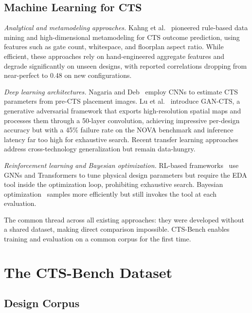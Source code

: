 \documentclass[acmsmall,review,anonymous]{acmart}
\begin{document}
\subsection{Machine Learning for CTS}

\textit{Analytical and metamodeling approaches.}
Kahng et al.~\cite{kahng,kahng2,kahng3} pioneered rule-based data mining and
high-dimensional metamodeling for CTS outcome prediction, using features such
as gate count, whitespace, and floorplan aspect ratio. While efficient, these
approaches rely on hand-engineered aggregate features and degrade significantly
on unseen designs, with reported correlations dropping from near-perfect to
0.48 on new configurations.

\textit{Deep learning architectures.}
Nagaria and Deb~\cite{nagaria2020} employ CNNs to estimate CTS parameters
from pre-CTS placement images. Lu et al.~\cite{gan-cts} introduce GAN-CTS, a
generative adversarial framework that exports high-resolution spatial maps and
processes them through a 50-layer convolution, achieving impressive per-design
accuracy but with a 45\% failure rate on the NOVA benchmark and inference
latency far too high for exhaustive search. Recent transfer learning
approaches~\cite{zhang2024,zhao2025} address cross-technology generalization
but remain data-hungry.

\textit{Reinforcement learning and Bayesian optimization.}
RL-based frameworks~\cite{agnesina,thomas2025} use GNNs and Transformers to
tune physical design parameters but require the EDA tool inside the
optimization loop, prohibiting exhaustive search.
Bayesian optimization~\cite{geng2022,zheng2023} samples more efficiently but
still invokes the tool at each evaluation.

The common thread across all existing approaches: they were developed without
a shared dataset, making direct comparison impossible. CTS-Bench enables
training and evaluation on a common corpus for the first time.

\section{The CTS-Bench Dataset}
\label{sec:dataset}

\subsection{Design Corpus}
\end{document}
